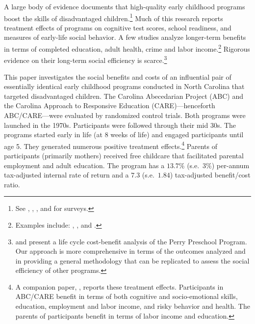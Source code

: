 \noindent A large body of evidence documents that high-quality early childhood programs boost the skills of disadvantaged children.\footnote{See \citet{Cunha_Heckman_ea_2006_HEE}, \citet{Almond-Currie_2011_JEP}, \citet{Duncan_Magnuson_2013_JEP}, and \citet{Elango_Hojman_etal_2016_Early-Edu} for surveys.} Much of this research reports treatment effects of programs on cognitive test scores, school readiness, and measures of early-life social behavior. A few studies analyze longer-term benefits in terms of completed education, adult health, crime and labor income.\footnote{Examples include: \citet{Heckman_Moon_etal_2010_QE}, \citet{Havnes_Mogstad_2011_AEJEP}, and \citet{Campbell_Conti_etal_2014_EarlyChildhoodInvestments}.} Rigorous evidence on their long-term social efficiency is scarce.\footnote{\citet{Belfield_Nores_etal_2006_JHR} and \citet{Heckman_Moon_etal_2010_RateofReturn} present a life cycle cost-benefit analysis of the Perry Preschool Program. Our approach is more comprehensive in terms of the outcomes analyzed and in providing a general methodology that can be replicated to assess the social efficiency of other programs.}

This paper investigates the social benefits and costs of an influential pair of essentially identical early childhood programs conducted in North Carolina that targeted disadvantaged children. The Carolina Abecedarian Project (ABC) and the Carolina Approach to Responsive Education (CARE)---henceforth ABC/CARE---were evaluated by randomized control trials. Both programs were launched in the 1970s. Participants were followed through their mid 30s. The programs started early in life (at 8 weeks of life) and engaged participants until age 5. They generated numerous positive treatment effects.\footnote{A companion paper, \citet{Garcia_Heckman_Ziff_2018_EER}, reports these treatment effects. Participants in ABC/CARE benefit in terms of both cognitive and socio-emotional skills, education, employment and labor income, and risky behavior and health. The parents of participants benefit in terms of labor income and education.} Parents of participants (primarily mothers) received free childcare that facilitated parental employment and adult education. The program has a $13.7\%$ (s.e.\ $3\%$) per-annum tax-adjusted internal rate of return and a $7.3$ (s.e.\ $1.84$) tax-adjusted benefit/cost ratio.

